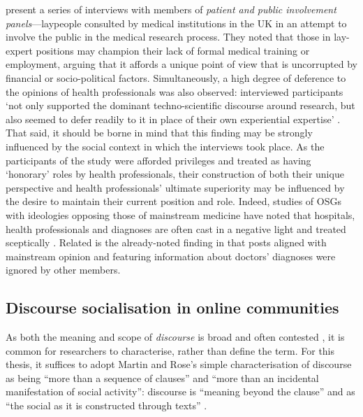 			\textcite{thompson_credibility_2012} present a series of interviews with members of \emph{patient and public involvement panels}---laypeople consulted by medical institutions in the UK in an attempt to involve the public in the medical research process. They noted that those in lay-expert positions may champion their lack of formal medical training or employment, arguing that it affords a unique point of view that is uncorrupted by financial or socio-political factors. Simultaneously, a high degree of deference to the opinions of health professionals was also observed: interviewed participants `not only supported the dominant techno-scientific discourse around research, but also seemed to defer readily to it in place of their own experiential expertise' \citeyear[p.~609]{thompson_credibility_2012}. That said, it should be borne in mind that this finding may be strongly influenced by the social context in which the interviews took place. As the participants of the study were afforded privileges and treated as having `honorary' roles by health professionals, their construction of both their unique perspective and health professionals' ultimate superiority may be influenced by the desire to maintain their current position and role. Indeed, studies of OSGs with ideologies opposing those of mainstream medicine have noted that hospitals, health professionals and diagnoses are often cast in a negative light and treated sceptically \cite{mulveen_interpretative_2006}. Related is the already-noted finding in \textcite{horne_doing_2009} that posts aligned with mainstream opinion and featuring information about doctors' diagnoses were ignored by other members.


	  \subsection{Discourse socialisation in online communities}

		 As both the meaning and scope of \emph{discourse} is broad and often contested \cite{gee_discourse_2004,gee_introduction_2013}, it is common for researchers to characterise, rather than define the term. For this thesis, it suffices to adopt Martin and Rose's simple characterisation of discourse as being ``more than a sequence of clauses'' and ``more than an incidental manifestation of social activity'': discourse is ``meaning beyond the clause'' and as ``the social as it is constructed through texts'' \citeyear[p.~1]{martin_working_2003}.  %

